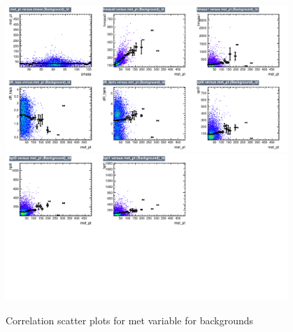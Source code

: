 \begin{figure}[!htb]%
\centering
\includegraphics[width=0.95\textwidth]{figures/CRDY/dataset/plots/correlationscatter_met_pt__Id_c3.pdf}
\includegraphics[width=0.95\textwidth]{figures/CRDY/dataset/plots/correlationscatter_met_pt__Id_c4.pdf}
\caption{ Correlation scatter plots for met variable for backgrounds}%
\label{fig:correlations_CRDY_met_pt_BG}                                                       
\end{figure}





